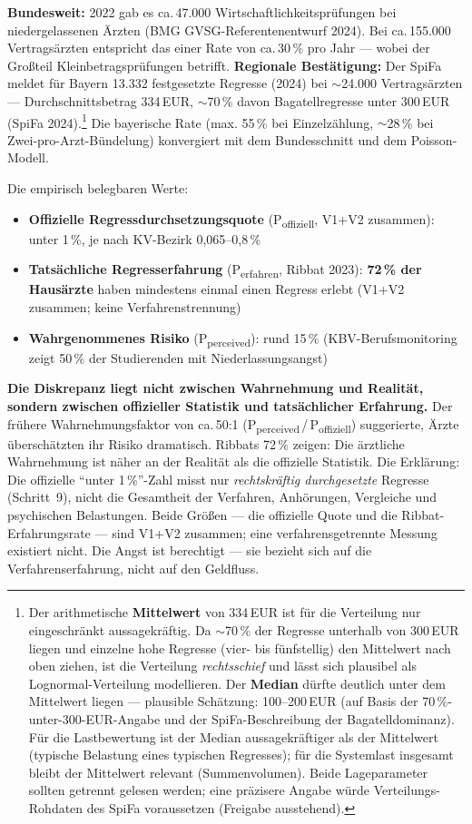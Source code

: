 \documentclass{umbruch-position}
\begin{document}
\textbf{Bundesweit:} 2022 gab es ca.\,47.000 Wirtschaftlichkeitsprüfungen bei niedergelassenen Ärzten (BMG GVSG-Referentenentwurf 2024). Bei ca.\,155.000 Vertragsärzten entspricht das einer Rate von ca.\,30\,\% pro Jahr --- wobei der Großteil Kleinbetragsprüfungen betrifft. \textbf{Regionale Bestätigung:} Der SpiFa meldet für Bayern 13.332 festgesetzte Regresse (2024) bei $\sim$24.000 Vertragsärzten --- Durchschnittsbetrag 334\,EUR, $\sim$70\,\% davon Bagatellregresse unter 300\,EUR (SpiFa 2024).\footnote{Der arithmetische \textbf{Mittelwert} von 334\,EUR ist für die Verteilung nur eingeschränkt aussagekräftig. Da $\sim$70\,\% der Regresse unterhalb von 300\,EUR liegen und einzelne hohe Regresse (vier- bis fünfstellig) den Mittelwert nach oben ziehen, ist die Verteilung \textit{rechtsschief} und lässt sich plausibel als Lognormal-Verteilung modellieren. Der \textbf{Median} dürfte deutlich unter dem Mittelwert liegen --- plausible Schätzung: 100--200\,EUR (auf Basis der 70\,\%-unter-300-EUR-Angabe und der SpiFa-Beschreibung der Bagatelldominanz). Für die Lastbewertung ist der Median aussagekräftiger als der Mittelwert (typische Belastung eines typischen Regresses); für die Systemlast insgesamt bleibt der Mittelwert relevant (Summenvolumen). Beide Lageparameter sollten getrennt gelesen werden; eine präzisere Angabe würde Verteilungs-Rohdaten des SpiFa voraussetzen (Freigabe ausstehend).} Die bayerische Rate (max. 55\,\% bei Einzelzählung, $\sim$28\,\% bei Zwei-pro-Arzt-Bündelung) konvergiert mit dem Bundesschnitt und dem Poisson-Modell.

Die empirisch belegbaren Werte:

\begin{itemize}[nosep]
  \item \textbf{Offizielle Regressdurchsetzungsquote} (P\textsubscript{offiziell}, V1+V2 zusammen): unter 1\,\%, je nach KV-Bezirk 0,065--0,8\,\%
  \item \textbf{Tatsächliche Regresserfahrung} (P\textsubscript{erfahren}, Ribbat 2023): \textbf{72\,\% der Hausärzte} haben mindestens einmal einen Regress erlebt (V1+V2 zusammen; keine Verfahrenstrennung)
  \item \textbf{Wahrgenommenes Risiko} (P\textsubscript{perceived}): rund 15\,\% (KBV-Berufsmonitoring zeigt 50\,\% der Studierenden mit Niederlassungsangst)
\end{itemize}

\textbf{Die Diskrepanz liegt nicht zwischen Wahrnehmung und Realität, sondern zwischen offizieller Statistik und tatsächlicher Erfahrung.} Der frühere Wahrnehmungsfaktor von ca.\,50:1 (P\textsubscript{perceived}\,/\,P\textsubscript{offiziell}) suggerierte, Ärzte überschätzten ihr Risiko dramatisch. Ribbats 72\,\% zeigen: Die ärztliche Wahrnehmung ist näher an der Realität als die offizielle Statistik. Die Erklärung: Die offizielle ``unter 1\,\%''-Zahl misst nur \textit{rechtskräftig durchgesetzte} Regresse (Schritt~9), nicht die Gesamtheit der Verfahren, Anhörungen, Vergleiche und psychischen Belastungen. Beide Größen --- die offizielle Quote und die Ribbat-Erfahrungsrate --- sind V1+V2 zusammen; eine verfahrensgetrennte Messung existiert nicht. Die Angst ist berechtigt --- sie bezieht sich auf die Verfahrenserfahrung, nicht auf den Geldfluss.
\end{document}
